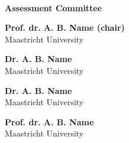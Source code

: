 ~\vfill
\par\noindent\normalfont\fontsize{15}{8}\sffamily\selectfont
\color{offBlack!70}\textbf{Assessment Committee\\}\par

\par\noindent\normalfont\fontsize{10}{10}\sffamily\selectfont
\color{offBlack}\textbf{Prof. dr. A. B. Name (chair)\\}
\color{offBlack!60}Maastricht University\par

\par\noindent\normalfont\fontsize{10}{10}\sffamily\selectfont
\color{offBlack}\textbf{Dr. A. B. Name\\}
\color{offBlack!60}Maastricht University\par

\par\noindent\normalfont\fontsize{10}{10}\sffamily\selectfont
\color{offBlack}\textbf{Dr. A. B. Name\\}
\color{offBlack!60}Maastricht University\par

\par\noindent\normalfont\fontsize{10}{10}\sffamily\selectfont
\color{offBlack}\textbf{Prof. dr. A. B. Name\\}
\color{offBlack!60}Maastricht University\par

\endgroup

\newpage
{} %

\pagestyle{empty} %

\setcounter{tocdepth}{0}

\vspace{-5cm}

\tableofcontents %




\pagestyle{fancy} %
